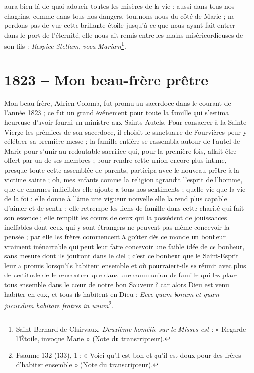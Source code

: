 \documentclass[11pt,a4paper]{report}
\begin{document}
aura bien là de quoi adoucir toutes les misères de la vie ; aussi dans tous nos chagrins, comme dans tous nos dangers, tournons-nous du côté de Marie ; ne perdons pas de vue cette brillante étoile jusqu'à ce que nous ayant fait entrer dans le port de l'éternité, elle nous ait remis entre les mains miséricordieuses de son fils : \textit{Respice Stellam, voca Mariam}\footnote{Saint Bernard de Clairvaux, \textit{Deuxième homélie sur le Missus est} : « Regarde l'Étoile, invoque Marie » (Note du transcripteur).}.

\section*{1823 -- Mon beau-frère prêtre}

Mon beau-frère, Adrien Colomb, fut promu au sacerdoce dans le courant de l'année 1823 ; ce fut un grand événement pour toute la famille qui s'estima heureuse d'avoir fourni un ministre aux Saints Autels. Pour consacrer à la Sainte Vierge les prémices de son sacerdoce, il choisit le sanctuaire de Fourvières pour y célébrer sa première messe ; la famille entière se rassembla autour de l'autel de Marie pour s'unir au redoutable sacrifice qui, pour la première fois, allait être offert par un de ses membres ; pour rendre cette union encore plus intime, presque toute cette assemblée de parents, participa avec le nouveau prêtre à la victime sainte ; oh, mes enfants comme la religion agrandit l'esprit de l'homme, que de charmes indicibles elle ajoute à tous nos sentiments ; quelle vie que la vie de la foi : elle donne à l'âme une vigueur nouvelle elle la rend plus capable d'aimer et de sentir ; elle retrempe les liens de famille dans cette charité qui fait son essence ; elle remplit les cœurs de ceux qui la possèdent de jouissances ineffables dont ceux qui y sont étrangers ne peuvent pas même concevoir la pensée ; par elle les frères commencent à goûter dès ce monde un bonheur vraiment inénarrable qui peut leur faire concevoir une faible idée de ce bonheur, sans mesure dont ils jouiront dans le ciel ; c'est ce bonheur que le Saint-Esprit leur a promis lorsqu'ils habitent ensemble et où pourraient-ils se réunir avec plus de certitude de le rencontrer que dans une communion de famille qui les place tous ensemble dans le cœur de notre bon Sauveur ? car alors Dieu est venu habiter en eux, et tous ils habitent en Dieu : \textit{Ecce quam bonum et quam jucundum habitare fratres in unum}\footnote{Psaume 132 (133), 1 : « Voici qu'il est bon et qu'il est doux pour des frères d'habiter ensemble » (Note du transcripteur).}.
\end{document}
